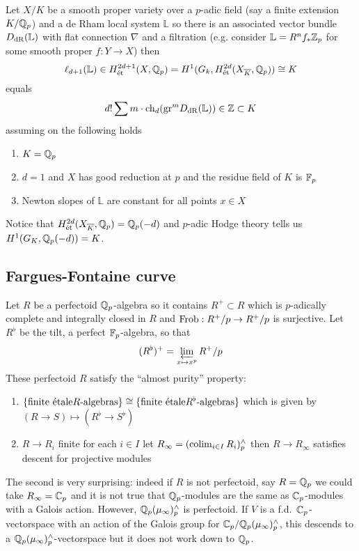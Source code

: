 \documentclass[12pt]{article}
\renewcommand{\gr}{\mathrm{gr}}
\newcommand{\LL}{\mathbb{L}}
\begin{document}
\begin{theorem}
Let $X / K$ be a smooth proper variety over a $p$-adic field (say a finite extension $K / \mathbb{Q}_p$) and a de Rham local system $\LL$ so there is an associated vector bundle $D_{\dR}(\LL)$ with flat connection $\nabla$ and a filtration (e.g. consider $\LL = R^n f_* \Z_p$ for some smooth proper $f : Y \to X$) then
\[ \ell_{d+1}(\LL) \in H^{2d+1}_{\et}(X, \Q_p) = H^1(G_k, H^{2d}_{\et}(X_{\ol{K}}, \Q_p)) \cong K \]
equals
\[ d! \sum m \cdot \mathrm{ch}_d(\gr^m D_{\dR}(\LL)) \in \Z \subset K \]
assuming on the following holds
\begin{enumerate}
\item $K = \mathbb{Q}_p$
\item $d = 1$ and $X$ has good reduction at $p$ and the residue field of $K$ is $\mathbb{F}_p$
\item Newton slopes of $\LL$ are constant for all points $x \in X$
\end{enumerate}
\end{theorem}

\begin{rmk}
Notice that $H^{2d}_{\text{\'{e}t}}(X_{\overline{K}}, \mathbb{Q}_p) = \mathbb{Q}_p(-d)$ and $p$-adic Hodge theory tells us $H^1(G_K, \mathbb{Q}_p(-d)) = K$. 
\end{rmk}

\subsection{Fargues-Fontaine curve}

Let $R$ be a perfectoid $\mathbb{Q}_p$-algebra so it contains $R^+ \subset R$ which is $p$-adically complete and integrally closed in $R$ and $\operatorname{\mathrm{Frob}} : R^+ / p \to R^+ / p$ is surjective. Let $R^{\flat}$ be the tilt, a perfect $\mathbb{F}_p$-algebra, so that 
\[ (R^{\flat})^+ = \operatorname*{\varprojlim}_{x \mapsto x^p} R^+ / p \]
These perfectoid $R$ satisfy the ``almost purity'' property:
\begin{enumerate}
\item $\{ \text{finite \'{e}tale} R\text{-algebras} \} \cong \{ \text{finite \'{e}tale} R^{\flat}\text{-algebras}\}$ which is given by $(R \to S) \mapsto (R^{\flat} \to S^{\flat})$
\item $R \to R_i$ finite \etale for each $i \in I$ let $R_{\infty} = (\operatorname*{\mathrm{colim}}_{i \in I} R_i)_p^{\wedge}$ then $R \to R_{\infty}$ satisfies descent for projective modules
\end{enumerate}

\begin{rmk}
The second is very surprising: indeed if $R$ is not perfectoid, say $R = \mathbb{Q}_p$ we could take $R_{\infty} = \mathbb{C}_p$ and it is not true that $\mathbb{Q}_p$-modules are the same as $\mathbb{C}_p$-modules with a Galois action. However, $\mathbb{Q}_p(\mu_{\infty})_p^{\wedge}$ is perfectoid. If $V$ is a f.d.\ $\mathbb{C}_p$-vectorspace with an action of the Galois group for $\mathbb{C}_p / \mathbb{Q}_p(\mu_{\infty})_p^{\wedge}$, this descends to a $\mathbb{Q}_p(\mu_{\infty})_p^{\wedge}$-vectorspace but it does not work down to $\mathbb{Q}_p$. 
\end{rmk}
\end{document}
